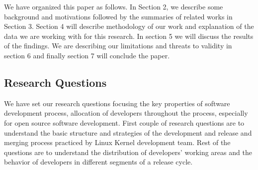 \documentclass{acm_proc_article-sp}
\begin{document}
We have organized this paper as follows. In Section 2, we describe some background and motivations followed by the summaries of related works in Section 3. Section 4 will describe methodology of our work and explanation of the data we are working with for this research. In section 5 we will discuss the results of the findings. We are describing our limitations and threats to validity in section 6 and finally section 7 will conclude the paper.

\subsection{Research Questions}
We have set our research questions focusing the key properties of software development process, allocation of developers throughout the process, especially for open source software development. First couple of research questions are to understand the basic structure and strategies of the development and release and merging process practiced by Linux Kernel development team. Rest of the questions are to understand the distribution of developers' working areas and the behavior of developers in different segments of a release cycle.
\end{document}
